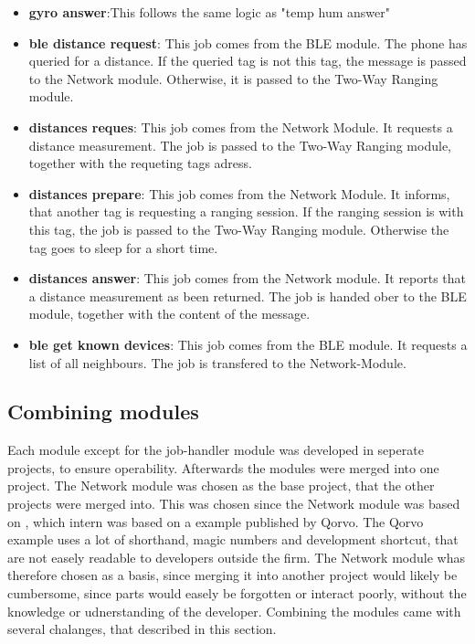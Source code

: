 \begin{itemize}
  \item \textbf{gyro answer}:This follows the same logic as "temp hum answer"
  \item \textbf{ble distance request}: This job comes from the BLE module. The phone has queried for a distance. If the queried tag is not this tag, the message is passed to the Network module. Otherwise, it is passed to the Two-Way Ranging module.
  \item \textbf{distances reques}: This job comes from the Network Module. It requests a distance measurement. The job is passed to the Two-Way Ranging module, together with the requeting tags adress.
  \item \textbf{distances prepare}: This job comes from the Network Module. It informs, that another tag is requesting a ranging session. If the ranging session is with this tag, the job is passed to the Two-Way Ranging module. Otherwise the tag goes to sleep for a short time.
  \item \textbf{distances answer}: This job comes from the Network module. It reports that a distance measurement as been returned. The job is handed ober to the BLE module, together with the content of the message.
  \item \textbf{ble get known devices}: This job comes from the BLE module. It requests a list of all neighbours. The job is transfered to the Network-Module.
\end{itemize}


\subsection{Combining modules}
\label{ss:combination}
Each module except for the job-handler module was developed in seperate projects, to ensure operability.
Afterwards the modules were merged into one project.
The Network module was chosen as the base project, that the other projects were merged into.
This was chosen since the Network module was based on \cite{degkwitz2023ultrawideband}, which intern was based on a example published by Qorvo.
The Qorvo example uses a lot of shorthand, magic numbers and development shortcut, that are not easely readable to developers outside the firm.
The Network module whas therefore chosen as a basis, since merging it into another project would likely be cumbersome, since parts would easely be forgotten or interact poorly, without the knowledge or udnerstanding of the developer.
Combining the modules came with several chalanges, that described in this section.


